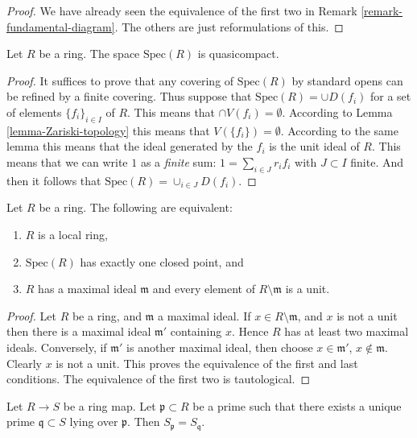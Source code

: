 \begin{proof}
We have already seen the equivalence of the first two
in Remark \ref{remark-fundamental-diagram}. The others
are just reformulations of this.
\end{proof}

\begin{lemma}
\label{lemma-quasicompact}
Let $R$ be a ring. The space $\text{Spec}(R)$ is quasicompact.
\end{lemma}

\begin{proof}
It suffices to prove that any covering of $\text{Spec}(R)$
by standard opens can be refined by a finite covering.
Thus suppose that $\text{Spec}(R) = \cup D(f_i)$
for a set of elements $\{f_i\}_{i\in I}$ of $R$. This means that
$\cap V(f_i) = \emptyset$. According to Lemma
\ref{lemma-Zariski-topology} this means that
$V(\{f_i \}) = \emptyset$. According to the
same lemma this means that the ideal generated
by the $f_i$ is the unit ideal of $R$. This means
that we can write $1$ as a {\it finite} sum:
$1 = \sum_{i \in J} r_i f_i$ with $J \subset I$ finite.
And then it follows that $\text{Spec}(R)
= \cup_{i \in J} D(f_i)$.
\end{proof}


\begin{lemma}
\label{lemma-characterize-local-ring}
Let $R$ be a ring. The following are equivalent:
\begin{enumerate}
\item $R$ is a local ring,
\item $\text{Spec}(R)$ has exactly one closed point, and
\item $R$ has a maximal ideal $\mathfrak m$
and every element of $R \setminus \mathfrak m$
is a unit.
\end{enumerate}
\end{lemma}

\begin{proof}
Let $R$ be a ring, and $\mathfrak m$ a maximal ideal.
If $x \in R \setminus \mathfrak m$, and $x$ is not a unit
then there is a maximal ideal $\mathfrak m'$ containing
$x$. Hence $R$ has at least two maximal ideals. Conversely,
if $\mathfrak m'$ is another maximal ideal, then choose
$x \in \mathfrak m'$, $x \not \in \mathfrak m$. Clearly
$x$ is not a unit. This proves the equivalence of the
first and last conditions. The equivalence of the first
two is tautological.
\end{proof}

\begin{lemma}
\label{lemma-unique-prime-over-localize-below}
Let $R \to S$ be a ring map.
Let $\mathfrak p \subset R$ be a prime such that there exists
a unique prime $\mathfrak q \subset S$ lying over $\mathfrak p$.
Then $S_{\mathfrak p} = S_{\mathfrak q}$.
\end{lemma}

